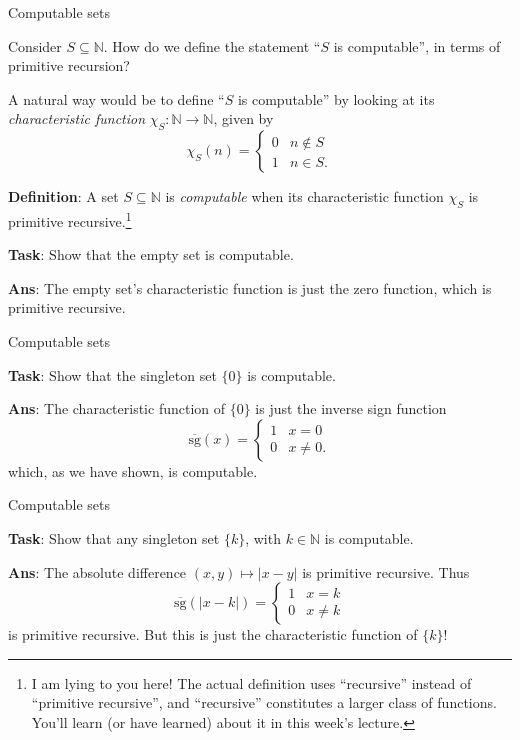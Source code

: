 \documentclass{beamer}
\newcommand{\N}{\mathbb N}
\begin{document}
\begin{frame}{Computable sets}

Consider $S \subseteq \N$. How do we define the statement ``$S$ is computable'', in terms of primitive recursion?

\pause
A natural way would be to define ``$S$ is computable'' by looking at its \textit{characteristic function} $\chi_S: \N \to \N$, given by
$$\chi_S(n) = \begin{cases}
0 & n \notin S\\
1 & n \in S.
\end{cases}$$

\textbf{Definition}: A set $S \subseteq \N$ is \textit{computable} when its characteristic function $\chi_S$ is primitive recursive.\footnote{I am lying to you here! The actual definition uses ``recursive'' instead of ``primitive recursive'', and ``recursive'' constitutes a larger class of functions. You'll learn (or have learned) about it in this week's lecture.}

\textbf{Task}: Show that the empty set is computable. \pause

\textbf{Ans}: The empty set's characteristic function is just the zero function, which is primitive recursive.
    
\end{frame}

\begin{frame}{Computable sets}

\textbf{Task}: Show that the singleton set $\{0\}$ is computable. \pause

\textbf{Ans}: The characteristic function of $\{0\}$ is just the inverse sign function
$$\overline{\mathrm{sg}}(x) = \begin{cases}
    1 & x = 0\\
    0 & x \neq 0.
    \end{cases}$$
which, as we have shown, is computable.
    
\end{frame}

\begin{frame}{Computable sets}

\textbf{Task}: Show that any singleton set $\{k\}$, with $k \in \N$ is computable. \pause

\textbf{Ans}: The absolute difference $(x, y) \mapsto |x - y|$ is primitive recursive. Thus
$$\overline{\mathrm{sg}}(|x - k|) = \begin{cases}
1 & x = k\\
0 & x \neq k
\end{cases}$$
is primitive recursive. But this is just the characteristic function of $\{k\}$!
    
\end{frame}
\end{document}
